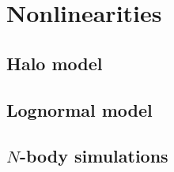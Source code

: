 \chapter{Nonlinearities}
\section{Halo model}
\section{Lognormal model}
\section{$N$-body simulations}
